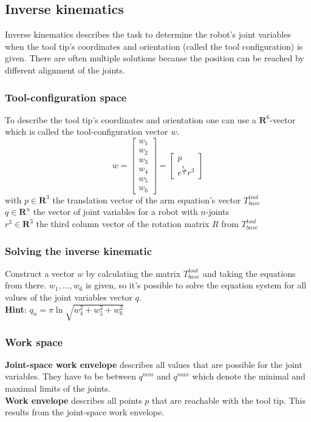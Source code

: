 \documentclass{article}
\begin{document}
	\subsection{Inverse kinematics}
	Inverse kinematics describes the task to determine the robot's joint variables when the tool tip's coordinates and orientation (called the tool configuration) is given. There are often multiple solutions because the position can be reached by different alignment of the joints.
	
	\subsubsection{Tool-configuration space}
	To describe the tool tip's coordinates and orientation one can use a $\mathbf{R}^6$-vector which is called the tool-configuration vector $w$.\\
	\begin{equation}
	w = 
	\begin{bmatrix}
	w_1 \\ w_2 \\ w_3 \\ w_4 \\ w_5 \\ w_6
	\end{bmatrix} = 
	\begin{bmatrix}
	p \\ e^{\frac{q_n}{\pi}}r^3
	\end{bmatrix}
	\end{equation}
	with $p \in \mathbf{R}^3$ the translation vector of the arm equation's vector $T^{tool}_{base}$\\
	$q \in \mathbf{R}^n$ the vector of joint variables for a robot with $n$-joints\\
	$r^3 \in \mathbf{R}^3$ the third column vector of the rotation matrix $R$ from $T^{tool}_{base}$
	
	\subsubsection{Solving the inverse kinematic}
	Construct a vector $w$ by calculating the matrix $T^{tool}_{base}$ and taking the equations from there. $w_1, ..., w_6$ is given, so it's possible to solve the equation system for all values of the joint variables vector $q$.\\
	\textbf{Hint}: $q_n = \pi \ln \sqrt{w_4^2+w_5^2+w_6^2}$

	\subsubsection{Work space}
	\textbf{Joint-space work envelope} describes all values that are possible for the joint variables. They have to be between $q^{min}$ and $q^{max}$ which denote the minimal and maximal limits of the joints.\\
	\textbf{Work envelope} describes all points $p$ that are reachable with the tool tip. This results from the joint-space work envelope.
	
\end{document}
